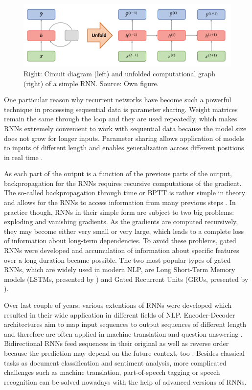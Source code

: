 \documentclass[]{krantz}
\begin{document}
\begin{figure}

{\centering \includegraphics[width=1\linewidth]{figures/01-00-deep-learning-for-nlp/01_02_unfolded_graph} 

}

\caption{Right: Circuit diagram (left) and unfolded computational graph (right) of a simple RNN. Source: Own figure.}\label{fig:01-00-unfolded}
\end{figure}

One particular reason why recurrent networks have become such a powerful technique in processing sequential data is parameter sharing. Weight matrices remain the same through the loop and they are used repeatedly, which makes RNNs extremely convenient to work with sequential data because the model size does not grow for longer inputs. Parameter sharing allows application of models to inputs of different length and enables generalization across different positions in real time \citep{goodfellow2016deep}.

As each part of the output is a function of the previous parts of the output, backpropagation for the RNNs requires recursive computations of the gradient. The so-called backpropagation through time or BPTT is rather simple in theory and allows for the RNNs to access information from many previous steps \citep{boden2002guide}. In practice though, RNNs in their simple form are subject to two big problems: exploding and vanishing gradients. As the gradients are computed recursively, they may become either very small or very large, which leads to a complete loss of information about long-term dependencies. To avoid these problems, gated RNNs were developed and accumulation of information about specific features over a long duration became possible. The two most popular types of gated RNNs, which are widely used in modern NLP, are Long Short-Term Memory models (LSTMs, presented by \citet{hochreiter1997long}) and Gated Recurrent Units (GRUs, presented by \citet{cho2014learning}).

Over last couple of years, various extentions of RNNs were developed which resulted in their wide application in different fields of NLP. Encoder-Decoder architectures aim to map input sequences to output sequences of different length and therefore are often applied in machine translation and question answering \citep{sutskever2014sequence}. Bidirectional RNNs feed sequences in their original as well as reverse order because the prediction may depend on the future context, too \citep{schuster1997bidirectional}. Besides classical tasks as document classification and sentiment analysis, more complicated challenges such as machine translation, part-of-speech tagging or speech recognition can be solved nowadays with the help of advanced versions of RNNs.
\end{document}

